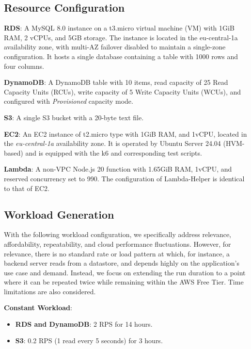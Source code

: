 \subsection{Resource Configuration}
\label{sec:config}

\textbf{RDS}:
A MySQL 8.0 instance on a t3.micro virtual machine (VM) with 1GiB RAM, 2 vCPUs, and 5GB storage. The instance is located in the eu-central-1a availability zone, with multi-AZ failover disabled to maintain a single-zone configuration. It hosts a single database containing a table with 1000 rows and four columns.


\textbf{DynamoDB}:
A DynamoDB table with 10 items, read capacity of 25 Read Capacity Units (RCUs), write capacity of 5 Write Capacity Units (WCUs), and configured with \textit{Provisioned} capacity mode.

\textbf{S3}:
A single S3 bucket with a 20-byte text file.

\textbf{EC2}:
An EC2 instance of t2.micro type with 1GiB RAM, and 1vCPU, located in the \textit{eu-central-1a} availability zone. It is operated by Ubuntu Server 24.04 (HVM-based) and is equipped with the k6 and corresponding test scripts.

\textbf{Lambda}:
A non-VPC Node.js 20 function with 1.65GiB RAM, 1vCPU, and reserved concurrency set to 990. The configuration of Lambda-Helper is identical to that of EC2.

\subsection{Workload Generation}
\label{sec:loads}

With the following workload configuration, we specifically address relevance, affordability, repeatability, and cloud performance fluctuations. However, for relevance, there is no standard rate or load pattern at which, for instance, a backend server reads from a datastore, and depends highly on the application's use case and demand. Instead, we focus on extending the run duration to a point where it can be repeated twice while remaining within the AWS Free Tier. Time limitations are also considered.

\textbf{Constant Workload}:
\begin{itemize}
	\item \textbf{RDS and DynamoDB}: 2 RPS for 14 hours.
	\item \textbf{S3}: 0.2 RPS (1 read every 5 seconds) for 3 hours.
\end{itemize}

